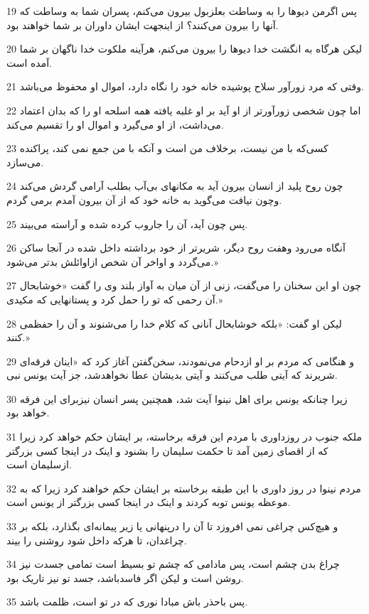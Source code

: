 \par 19 پس اگرمن دیوها را به وساطت بعلزبول بیرون می‌کنم، پسران شما به وساطت که آنها را بیرون می‌کنند؟ از اینجهت ایشان داوران بر شما خواهند بود.
\par 20 لیکن هرگاه به انگشت خدا دیوها را بیرون می‌کنم، هرآینه ملکوت خدا ناگهان بر شما آمده است.
\par 21 وقتی که مرد زورآور سلاح پوشیده خانه خود را نگاه دارد، اموال او محفوظ می‌باشد.
\par 22 اما چون شخصی زورآورتر از او آید بر او غلبه یافته همه اسلحه او را که بدان اعتماد می‌داشت، از او می‌گیرد و اموال او را تقسیم می‌کند.
\par 23 کسی‌که با من نیست، برخلاف من است و آنکه با من جمع نمی کند، پراکنده می‌سازد.
\par 24 چون روح پلید از انسان بیرون آید به مکانهای بی‌آب بطلب آرامی گردش می‌کند وچون نیافت می‌گوید به خانه خود که از آن بیرون آمدم برمی گردم.
\par 25 پس چون آید، آن را جاروب کرده شده و آراسته می‌بیند.
\par 26 آنگاه می‌رود وهفت روح دیگر، شریرتر از خود برداشته داخل شده در آنجا ساکن می‌گردد و اواخر آن شخص ازاوائلش بدتر می‌شود.»
\par 27 چون او این سخنان را می‌گفت، زنی از آن میان به آواز بلند وی را گفت «خوشابحال آن رحمی که تو را حمل کرد و پستانهایی که مکیدی.»
\par 28 لیکن او گفت: «بلکه خوشابحال آنانی که کلام خدا را می‌شنوند و آن را حفظمی کنند.»
\par 29 و هنگامی که مردم بر او ازدحام می‌نمودند، سخن‌گفتن آغاز کرد که «اینان فرقه‌ای شریرند که آیتی طلب می‌کنند و آیتی بدیشان عطا نخواهدشد، جز آیت یونس نبی.
\par 30 زیرا چنانکه یونس برای اهل نینوا آیت شد، همچنین پسر انسان نیزبرای این فرقه خواهد بود.
\par 31 ملکه جنوب در روزداوری با مردم این فرقه برخاسته، بر ایشان حکم خواهد کرد زیرا که از اقصای زمین آمد تا حکمت سلیمان را بشنود و اینک در اینجا کسی بزرگتر ازسلیمان است.
\par 32 مردم نینوا در روز داوری با این طبقه برخاسته بر ایشان حکم خواهند کرد زیرا که به موعظه یونس توبه کردند و اینک در اینجا کسی بزرگتر از یونس است.
\par 33 و هیچ‌کس چراغی نمی افروزد تا آن را درپنهانی یا زیر پیمانه‌ای بگذارد، بلکه بر چراغدان، تا هر‌که داخل شود روشنی را بیند.
\par 34 چراغ بدن چشم است، پس مادامی که چشم تو بسیط است تمامی جسدت نیز روشن است و لیکن اگر فاسدباشد، جسد تو نیز تاریک بود.
\par 35 پس باحذر باش مبادا نوری که در تو است، ظلمت باشد.

